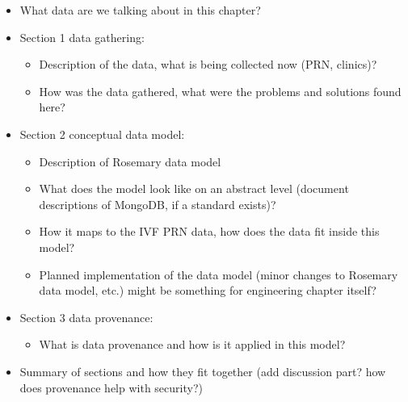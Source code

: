 \begin{itemize}
	\item What data are we talking about in this chapter?
	\item Section 1 data gathering:
	\begin{itemize}
		\item Description of the data, what is being collected now (PRN, clinics)?
		\item How was the data gathered, what were the problems and solutions found here?
	\end{itemize}
	\item Section 2 conceptual data model:
	\begin{itemize}
		\item Description of Rosemary data model
		\item What does the model look like on an abstract level (document descriptions of MongoDB, if a standard exists)?
		\item How it maps to the IVF PRN data, how does the data fit inside this model?
		\item Planned implementation of the data model (minor changes to Rosemary data model, etc.) {might be something for engineering chapter itself?}
	\end{itemize}
	\item Section 3 data provenance:
	\begin{itemize}
		\item What is data provenance and how is it applied in this model?
	\end{itemize}
	\item Summary of sections and how they fit together (add discussion part? how does provenance help with security?)
\end{itemize}